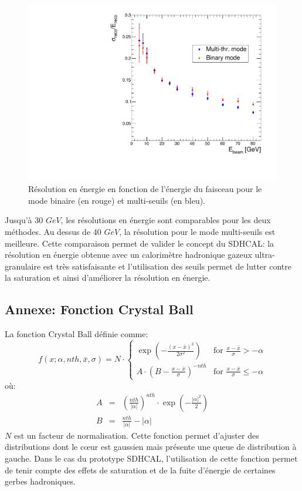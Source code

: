\begin{figure}[!ht]
  \begin{center}
    \includegraphics[width=.7\textwidth]{SDHCAL/figs/RESOLUTION.pdf}
    \caption{Résolution en énergie en fonction de l’énergie du faisceau pour le mode binaire (en rouge) et multi-seuils (en bleu).}
    \label{fig:multi_vs_binary_res}
  \end{center}
\end{figure}
Jusqu'à 30 $GeV$, les résolutions en énergie sont comparables pour les deux méthodes. Au dessus de 40 $GeV$, la résolution pour le mode multi-seuils est meilleure. Cette comparaison permet de valider le concept du SDHCAL: la résolution en énergie obtenue avec un calorimètre hadronique gazeux ultra-granulaire est très satisfaisante et l'utilisation des seuils permet de lutter contre la saturation et ainsi d'améliorer la résolution en énergie.
\clearpage
\newpage
\begin{subappendices}
\section{Annexe: Fonction Crystal Ball}
\label{app.crystallball}
La fonction Crystal Ball définie comme:
\begin{equation}
  f(x;\alpha,nth,\bar x,\sigma) = N \cdot \left\{
  \begin{array}{ll}
    \exp(- \frac{(x -\bar x)^2}{2 \sigma^2})      & \mbox{for } \frac{x - \bar x}{\sigma} > -\alpha \\ 
    A \cdot (B - \frac{x - \bar x}{\sigma})^{-nth}  & \mbox{for } \frac{x - \bar x}{\sigma} \leq -\alpha 
  \end{array} 
  \right.
\end{equation}
%
où:
\begin{eqnarray}
  A & = & \left(\frac{nth}{\left| \alpha \right|}\right)^{nth} \cdot \exp\left(- \frac {\left| \alpha \right|^2}{2}\right) \\
  B & = & \frac{nth}{\left| \alpha \right|} - \left| \alpha \right| 
\end{eqnarray}
%
$N$ est un facteur de normalisation. Cette fonction permet d'ajuster des distributions dont le cœur est gaussien mais présente une queue de distribution à gauche. Dans le cas du prototype SDHCAL, l'utilisation de cette fonction permet de tenir compte des effets de saturation et de la fuite d'énergie de certaines gerbes hadroniques.



\end{subappendices}
